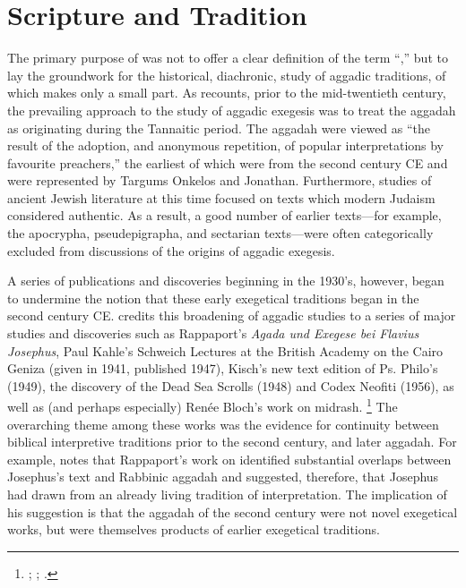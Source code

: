 
\section{Scripture and Tradition}

The primary purpose of  was not to offer a clear definition of the term ``\rwB,'' but to lay the groundwork for the historical, diachronic, study of aggadic traditions, of which \rwB makes only a small part.%
    \autocite[3]{vermes_zsengeller2014}
As \vermes recounts, prior to the mid-twentieth century, the prevailing approach to the study of aggadic exegesis was to treat the aggadah as originating during the Tannaitic period. The aggadah were viewed as ``the result of the adoption, and anonymous repetition, of popular interpretations by favourite preachers,''%
    \autocite[3]{vermes1961}
the earliest of which were from the second century CE and were represented by Targums Onkelos and Jonathan. Furthermore, studies of ancient Jewish literature at this time focused on texts which modern Judaism considered authentic. As a result, a good number of earlier texts---for example, the apocrypha, pseudepigrapha, and sectarian texts---were often categorically excluded from discussions of the origins of aggadic exegesis.%
    \autocite[2]{vermes1961} 

A series of publications and discoveries beginning in the 1930's, however, began to undermine the notion that these early exegetical traditions began in the second century CE. \vermes credits this broadening of aggadic studies to a series of major studies and discoveries such as Rappaport's \emph{Agada und Exegese bei Flavius Josephus},%
    \autocite{rappaport1930}
Paul Kahle's Schweich Lectures at the British Academy on the Cairo Geniza (given in 1941, published 1947),%
    \autocite{kahle1947}
Kisch's new text edition of Ps. Philo's \lab (1949),%
    \autocite{kisch1949}
the discovery of the Dead Sea Scrolls (1948) and Codex Neofiti (1956), as well as (and perhaps especially) Renée Bloch's work on midrash.%
    \footnote{%
        \cite{bloch1954};
        \cite{bloch1955_repr};
        \cite[3--7]{vermes1961}.}
The overarching theme among these works was the evidence for continuity between biblical interpretive traditions prior to the second century, and later aggadah. For example, \vermes notes that Rappaport's work on \ant identified substantial overlaps between Josephus's text and Rabbinic aggadah and suggested, therefore, that Josephus had drawn from an already living tradition of interpretation. The implication of his suggestion is that the aggadah of the second century were not novel exegetical works, but were themselves products of earlier exegetical traditions. 

